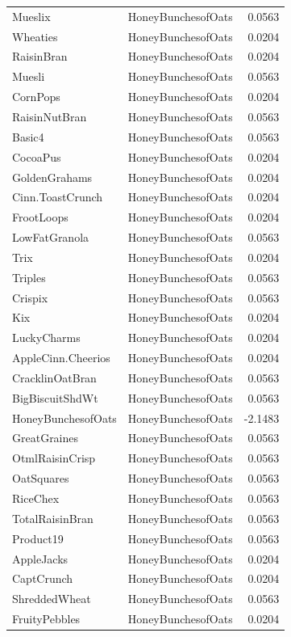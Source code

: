 \begin{longtable}{llr}
Mueslix & HoneyBunchesofOats & 0.0563 \\
Wheaties & HoneyBunchesofOats & 0.0204 \\
RaisinBran & HoneyBunchesofOats & 0.0204 \\
Muesli & HoneyBunchesofOats & 0.0563 \\
CornPops & HoneyBunchesofOats & 0.0204 \\
RaisinNutBran & HoneyBunchesofOats & 0.0563 \\
Basic4 & HoneyBunchesofOats & 0.0563 \\
CocoaPus & HoneyBunchesofOats & 0.0204 \\
GoldenGrahams & HoneyBunchesofOats & 0.0204 \\
Cinn.ToastCrunch & HoneyBunchesofOats & 0.0204 \\
FrootLoops & HoneyBunchesofOats & 0.0204 \\
LowFatGranola & HoneyBunchesofOats & 0.0563 \\
Trix & HoneyBunchesofOats & 0.0204 \\
Triples & HoneyBunchesofOats & 0.0563 \\
Crispix & HoneyBunchesofOats & 0.0563 \\
Kix & HoneyBunchesofOats & 0.0204 \\
LuckyCharms & HoneyBunchesofOats & 0.0204 \\
AppleCinn.Cheerios & HoneyBunchesofOats & 0.0204 \\
CracklinOatBran & HoneyBunchesofOats & 0.0563 \\
BigBiscuitShdWt & HoneyBunchesofOats & 0.0563 \\
HoneyBunchesofOats & HoneyBunchesofOats & -2.1483 \\
GreatGraines & HoneyBunchesofOats & 0.0563 \\
OtmlRaisinCrisp & HoneyBunchesofOats & 0.0563 \\
OatSquares & HoneyBunchesofOats & 0.0563 \\
RiceChex & HoneyBunchesofOats & 0.0563 \\
TotalRaisinBran & HoneyBunchesofOats & 0.0563 \\
Product19 & HoneyBunchesofOats & 0.0563 \\
AppleJacks & HoneyBunchesofOats & 0.0204 \\
CaptCrunch & HoneyBunchesofOats & 0.0204 \\
ShreddedWheat & HoneyBunchesofOats & 0.0563 \\
FruityPebbles & HoneyBunchesofOats & 0.0204 \\

\end{longtable}
